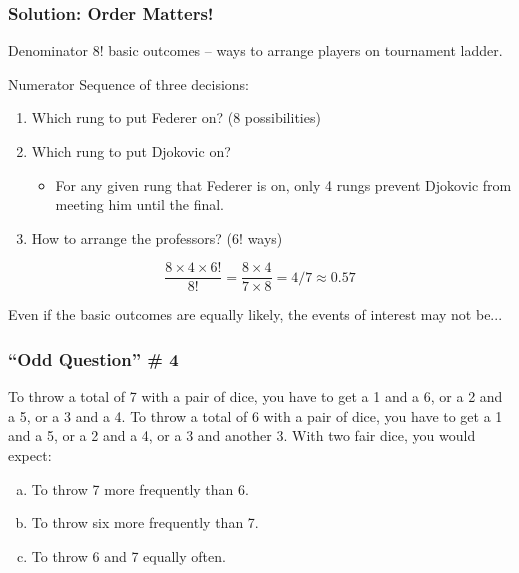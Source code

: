 \documentclass[handout]{beamer}
\begin{document}
\begin{frame}
  \frametitle{Solution: Order Matters!}
  \begin{block}{Denominator}
	$8!$ basic outcomes -- ways to arrange players on tournament ladder.
  \end{block}
  \begin{block}{Numerator}
   Sequence of three decisions:
   \begin{enumerate}
    \item Which rung to put Federer on? (8 possibilities)
    \item Which rung to put Djokovic on? 
      \begin{itemize}
        \item For any given rung that Federer is on, only 4 rungs prevent Djokovic from meeting him until the final.
      \end{itemize}
    \item How to arrange the professors? ($6!$ ways)
   \end{enumerate}
  \end{block}
\alert{$$\frac{8 \times 4 \times 6!}{8!} = \frac{8\times 4}{7\times 8} = 4/7 \approx 0.57$$}

\end{frame}
\begin{frame}

\centering \Huge Even if the basic outcomes are equally likely, the events of interest may not be...


\end{frame}
\begin{frame}
\frametitle{``Odd Question'' \# 4}
To throw a total of 7 with a pair of dice, you have to get a 1 and a 6, or a 2 and a 5, or a 3 and a 4.
To throw a total of 6 with a pair of dice, you have to get a 1 and a 5, or a 2 and a 4, or a 3 and another 3.
	\vspace{1em}
	With two fair dice, you would expect:
		\begin{enumerate}[(a)]
			\item To throw 7 more frequently than 6.
			\item To throw six more frequently than 7.
			\item To throw 6 and 7 equally often.
		\end{enumerate}
\end{frame}
\end{document}
